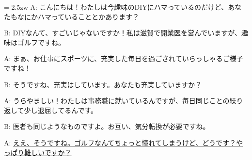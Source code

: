 \documentclass[11pt]{amsart}
\title{}
\author{}
\newenvironment{hangall}[1]{\hangindent = 2.5zw\everypar{\hangindent = 2.5zw}}{}
\begin{document}
\maketitle
\begin{hangall}{}%
A: こんにちは！わたしは今趣味のDIYにハマっているのだけど、あなたもなにかハマっていることとかあります？

B: DIYなんて、すごいじゃないですか！私は滋賀で開業医を営んでいますが、趣味はゴルフですね。

A: まぁ、お仕事にスポーツに、充実した毎日を過ごされていらっしゃるご様子ですね！

B: そうですね、充実はしています。あなたも充実していますか？

A: うらやましい！わたしは事務職に就いているんですが、毎日同じことの繰り返して少し退屈してるんです。

B: 医者も同じようなものですよ。お互い、気分転換が必要ですね。

A: \ul{ええ、そうですね。ゴルフなんてちょっと憧れてしまうけど、どうです？やっぱり難しいですか？}\end{hangall}
\end{document}
